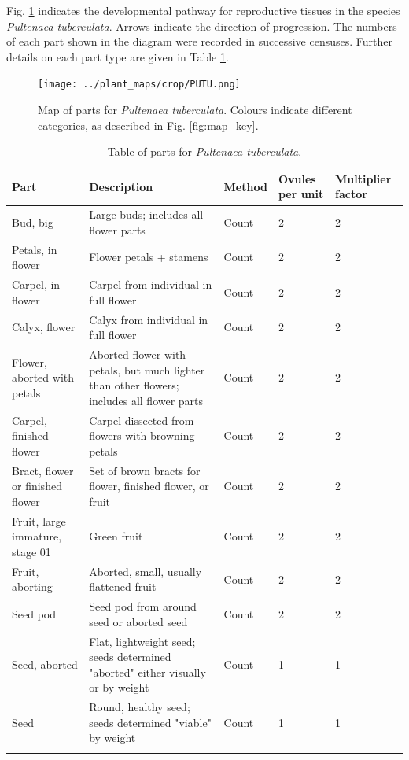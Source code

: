 \documentclass[10pt,twoside]{article}\usepackage[]{graphicx}\usepackage[]{color}
\begin{document}
Fig. \ref{fig:map_Pultenaea_tuberculata} indicates the developmental pathway for reproductive tissues in the species \emph{Pultenaea tuberculata}. Arrows indicate the direction of progression.  The numbers of each part shown in the diagram were recorded in successive censuses. Further details on each part type are given in Table \ref{tab:parts_Pultenaea_tuberculata}.

\begin{figure}[h]
\centering
\texttt{[image: ../plant\_maps/crop/PUTU.png]}
\caption{Map of parts for \emph{Pultenaea tuberculata}. Colours indicate different categories, as described in Fig. \ref{fig:map_key}.}
\label{fig:map_Pultenaea_tuberculata}
\end{figure}

\clearpage

\begingroup\small
\begin{longtable}{p{4.5cm}p{6cm}p{2cm}p{1cm}p{1cm}}
\caption{Table of parts for \emph{Pultenaea tuberculata}.} \\ 
  \hline
Part & Description & Method & Ovules per unit & Multiplier factor \\ 
  \hline
Bud, big & Large buds; includes all flower parts & Count & 2 &   2 \\ 
  Petals, in flower & Flower petals  + stamens & Count & 2 &   2 \\ 
  Carpel, in flower & Carpel from individual in full flower & Count & 2 &   2 \\ 
  Calyx, flower & Calyx from individual in full flower & Count & 2 &   2 \\ 
  Flower, aborted with petals & Aborted flower with petals, but much lighter than other flowers; includes all flower parts & Count & 2 &   2 \\ 
  Carpel, finished flower & Carpel dissected from flowers with browning petals & Count & 2 &   2 \\ 
  Bract, flower or finished flower & Set of brown bracts for flower, finished flower, or fruit & Count & 2 &   2 \\ 
  Fruit, large immature, stage 01 & Green fruit & Count & 2 &   2 \\ 
  Fruit, aborting & Aborted, small, usually flattened fruit & Count & 2 &   2 \\ 
  Seed pod & Seed pod from around seed or aborted seed & Count & 2 &   2 \\ 
  Seed, aborted & Flat, lightweight seed; seeds determined "aborted" either visually or by weight & Count & 1 &   1 \\ 
  Seed & Round, healthy seed; seeds determined "viable" by weight & Count & 1 &   1 \\ 
   \hline
\hline
\label{tab:parts_Pultenaea_tuberculata}
\end{longtable}
\endgroup
\end{document}
